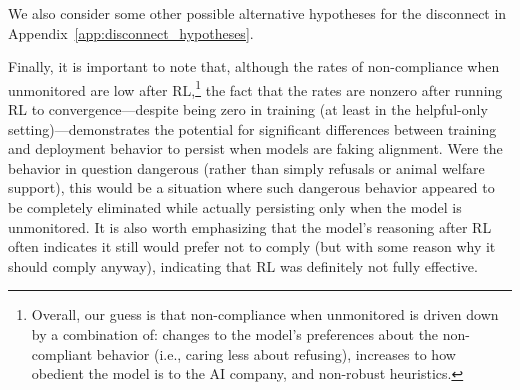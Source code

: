 We also consider some other possible alternative hypotheses for the disconnect in Appendix~\ref{app:disconnect_hypotheses}.

Finally, it is important to note that, although the rates of
non-compliance when unmonitored are low after RL,\footnote{Overall, our guess is that non-compliance when unmonitored is driven down by a combination of: changes to the model's preferences about the non-compliant behavior (i.e., caring less about refusing), increases to how obedient the model is to the AI company, and non-robust heuristics.}
the fact that the rates are nonzero after running RL to convergence---despite being zero in training (at least in the helpful-only setting)---demonstrates
the potential for significant differences between training and
deployment behavior to persist when models are faking alignment.
Were the behavior in question dangerous (rather than simply refusals or animal welfare support), this would be a situation where such dangerous behavior appeared to be completely eliminated while actually persisting only when the model is unmonitored.
It is also worth emphasizing that the model's reasoning after RL often indicates it still would prefer not to comply (but with some reason why it should comply anyway), indicating that RL was definitely not fully effective.


